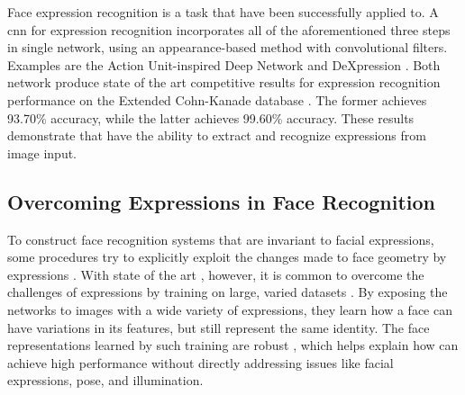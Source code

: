\noindent Face expression recognition is a task that  have been successfully applied to. A \acrshort{cnn} for expression recognition incorporates all of the aforementioned three steps in single network, using an appearance-based method with convolutional filters. Examples are the Action Unit-inspired Deep Network \cite{audn} and DeXpression \cite{dexpression}. Both network produce state of the art competitive results for expression recognition performance on the Extended Cohn-Kanade database \cite{ck-plus}. The former achieves 93.70\% accuracy, while the latter achieves 99.60\% accuracy. These results demonstrate that  have the ability to extract and recognize expressions from image input. 

\subsection{Overcoming Expressions in Face Recognition}

To construct face recognition systems that are invariant to facial expressions, some procedures try to explicitly exploit the changes made to face geometry by expressions \cite{exp-inv-1, exp-inv-2, exp-inv-3}. With state of the art , however, it is common to overcome the challenges of expressions by training on large, varied datasets \cite{facenet, deepface, deepid3}. By exposing the networks to images with a wide variety of expressions, they learn how a face can have variations in its features, but still represent the same identity. The face representations learned by such training are robust \cite{robust}, which helps explain how  can achieve high performance without directly addressing issues like facial expressions, pose, and illumination.

\cleardoublepage